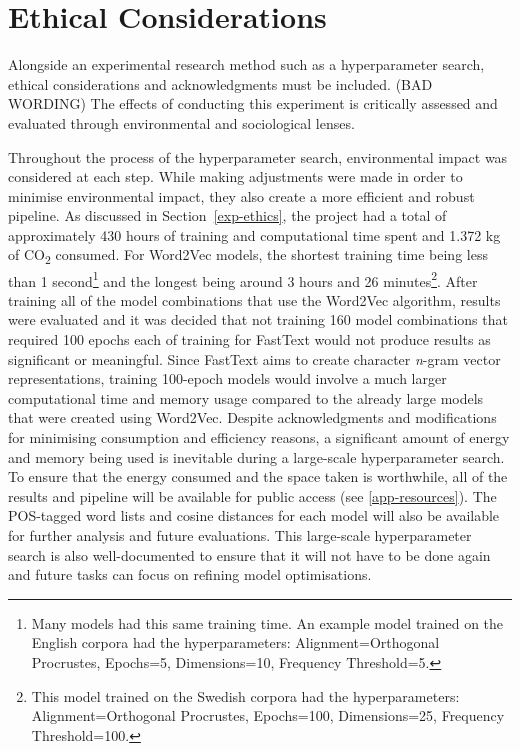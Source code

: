 \section{Ethical Considerations}
\label{sec:ethicalcons}

Alongside an experimental research method such as a hyperparameter search, ethical considerations and acknowledgments must be included. (BAD WORDING) The effects of conducting this experiment is critically assessed and evaluated through environmental and sociological lenses.

Throughout the process of the hyperparameter search, environmental impact was considered at each step. While making adjustments were made in order to minimise environmental impact, they also create a more efficient and robust pipeline. As discussed in Section~\ref{exp-ethics}, the project had a total of approximately 430 hours of training and computational time spent and 1.372 kg of CO\textsubscript{2} consumed. For Word2Vec models, the shortest training time being less than 1 second\footnote{Many models had this same training time. An example model trained on the English corpora had the hyperparameters: Alignment=Orthogonal Procrustes, Epochs=5, Dimensions=10, Frequency Threshold=5.} and the longest being around 3 hours and 26 minutes\footnote{This model trained on the Swedish corpora had the hyperparameters: Alignment=Orthogonal Procrustes, Epochs=100, Dimensions=25, Frequency Threshold=100.}. After training all of the model combinations that use the Word2Vec algorithm, results were evaluated and it was decided that not training 160 model combinations that required 100 epochs each of training for FastText would not produce results as significant or meaningful. Since FastText aims to create character \emph{n}-gram vector representations, training 100-epoch models would involve a much larger computational time and memory usage compared to the already large models that were created using Word2Vec. Despite acknowledgments and modifications for minimising consumption and efficiency reasons, a significant amount of energy and memory being used is inevitable during a large-scale hyperparameter search. To ensure that the energy consumed and the space taken is worthwhile, all of the results and pipeline will be available for public access (see \autoref{app-resources}). The POS-tagged word lists and cosine distances for each model will also be available for further analysis and future evaluations. This large-scale hyperparameter search is also well-documented to ensure that it will not have to be done again and future tasks can focus on refining model optimisations. 

